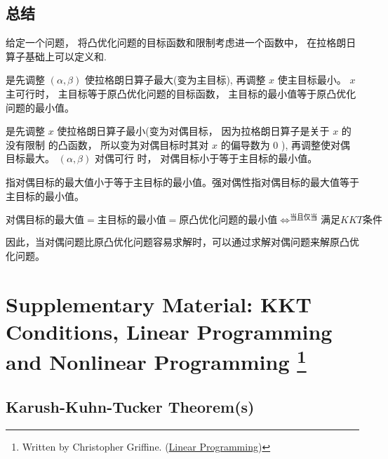 \subsection{总结}


给定一个问题， 将凸优化问题的目标函数和限制考虑进一个函数中， 在拉格朗日算子基础上可以定义和.

是先调整 $ (\alpha, \beta) $ 使拉格朗日算子最大(变为主目标), 再调整 $ x $ 使主目标最小。 $ x $ 主可行时， 主目标等于原凸优化问题的目标函数， 主目标的最小值等于原凸优化问题的最小值。

是先调整 $ x $ 使拉格朗日算子最小(变为对偶目标， 因为拉格朗日算子是关于 $ x $ 的没有限制 的凸函数， 所以变为对偶目标时其对 $ x $ 的偏导数为 0 ), 再调整使对偶目标最大。 $ (\alpha, \beta) $ 对偶可行 时， 对偶目标小于等于主目标的最小值。

指对偶目标的最大值小于等于主目标的最小值。强对偶性指对偶目标的最大值等于主目标的最小值。

\begin{equation}对偶目标的最大值=主目标的最小值=原凸优化问题的最小值 \Leftrightarrow^{当且仅当}满足KKT条件\end{equation}

因此，当对偶问题比原凸优化问题容易求解时，可以通过求解对偶问题来解原凸优化问题。


\section[Supplementary Material: KKT Conditions, Linear Programming and Nonlinear Programming]{Supplementary Material: KKT Conditions, Linear Programming and Nonlinear Programming \footnote{Written by Christopher Griffine. (\href{http://www.personal.psu.edu/cxg286/LinearProgramming.html}{Linear Programming})}}



\subsection{Karush-Kuhn-Tucker Theorem(s)}

